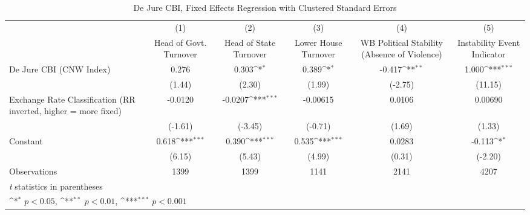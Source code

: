 \begin{table}[htbp]\centering
\def\sym#1{\ifmmode^{#1}\else\(^{#1}\)\fi}
\caption{De Jure CBI, Fixed Effects Regression with Clustered Standard Errors \label{multIndFEDJ}}
\begin{tabular*}{\linewidth}{@{\hskip\tabcolsep\extracolsep\fill}l*{5}{c}}
\toprule
                &\multicolumn{1}{c}{(1)}&\multicolumn{1}{c}{(2)}&\multicolumn{1}{c}{(3)}&\multicolumn{1}{c}{(4)}&\multicolumn{1}{c}{(5)}\\
                &\multicolumn{1}{c}{Head of Govt. Turnover}&\multicolumn{1}{c}{Head of State Turnover}&\multicolumn{1}{c}{Lower House Turnover}&\multicolumn{1}{c}{WB Political Stability (Absence of Violence)}&\multicolumn{1}{c}{Instability Event Indicator}\\
\midrule
De Jure CBI (CNW Index)&    0.276         &    0.303\sym{*}  &    0.389\sym{*}  &   -0.417\sym{**} &    1.000\sym{***}\\
                &   (1.44)         &   (2.30)         &   (1.99)         &  (-2.75)         &  (11.15)         \\
\addlinespace
Exchange Rate Classification (RR inverted, higher = more fixed)&  -0.0120         &  -0.0207\sym{***}& -0.00615         &   0.0106         &  0.00690         \\
                &  (-1.61)         &  (-3.45)         &  (-0.71)         &   (1.69)         &   (1.33)         \\
\addlinespace
Constant        &    0.618\sym{***}&    0.390\sym{***}&    0.535\sym{***}&   0.0283         &   -0.113\sym{*}  \\
                &   (6.15)         &   (5.43)         &   (4.99)         &   (0.31)         &  (-2.20)         \\
\midrule
Observations    &     1399         &     1399         &     1141         &     2141         &     4207         \\
\bottomrule
\multicolumn{6}{l}{\footnotesize \textit{t} statistics in parentheses}\\
\multicolumn{6}{l}{\footnotesize \sym{*} \(p<0.05\), \sym{**} \(p<0.01\), \sym{***} \(p<0.001\)}\\
\end{tabular*}
\end{table}
